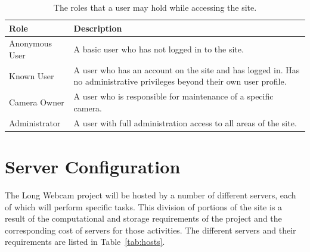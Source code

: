 \documentclass[11pt]{article}
\begin{document}
\begin{table}[h]
\begin{tabular}{ | p{1.45in} | p{4.45in} | }
\hline
\textbf{Role} & \textbf{Description} \\
\hline
Anonymous User & A basic user who has not logged in to the site. \\
\hline
Known User & A user who has an account on the site and has logged in. Has no administrative privileges beyond their own user profile. \\
\hline
Camera Owner & A user who is responsible for maintenance of a specific camera. \\
\hline
Administrator & A user with full administration access to all areas of the site. \\
\hline
\end{tabular}
\caption{The roles that a user may hold while accessing the site.}
\label{tab:roles}
\end{table}

\section{Server Configuration}
The Long Webcam project will be hosted by a number of different servers, each of which will perform specific tasks. This division of portions of the site is a result of the computational and storage requirements of the project and the corresponding cost of servers for those activities. The different servers and their requirements are listed in Table~\ref{tab:hosts}.
\end{document}
